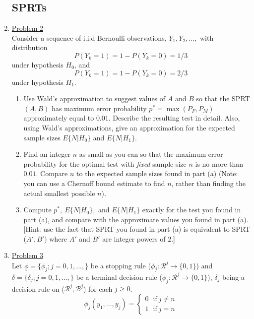\documentclass[a4paper,english,12pt]{article}
\begin{document}
\begin{enumerate}
\subsection*{SPRTs}
\item \hyperlink{solution2}{Problem 2}\\
Consider a sequence of i.i.d Bernoulli observations, $Y_1,Y_2,\dots,$ with distribution
\begin{equation*}
P(Y_k=1)=1-P(Y_k=0)=1/3
\end{equation*}
under hypothesis $H_0$, and 
\begin{equation*}
P(Y_k=1)=1-P(Y_k=0)=2/3
\end{equation*}
under hypothesis $H_1$.
\begin{enumerate}
\item Use Wald's approximation to suggest values of $A$ and $B$ so that the SPRT $(A,B)$ has maximum error probability $p^*=\max(P_F,P_M)$ approximately equal to $0.01$. Describe the resulting test in detail. Also, using Wald's approximations, give an approximation for the expected sample sizes $E\{N|H_0\}$ and $E\{N|H_1\}$.
\item Find an integer $n$ as small as you can so that the maximum error probability for the optimal test with {\em fixed} sample size $n$ is no more than $0.01$. Compare $n$ to the expected sample sizes found in part (a) (Note: you can use a Chernoff bound estimate to find $n$, rather than finding the actual smallest possible $n$).
\item Compute $p^*,~E\{N|H_0\},$ and $E\{N|H_1\}$ exactly for the test you found in part (a), and compare with the approximate values you found in part (a). [Hint: use the fact that SPRT you found in part (a) is equivalent to SPRT ($A',B'$) where $A'$ and $B'$ are integer powers of $2$.]
\end{enumerate}
\item \hyperlink{solution3}{Problem 3}\\
Let $\underline{\phi}=\{\phi_j;j=0,1,\dots,\}$ be a stopping rule ($\phi_j:\mathcal{R}^j\rightarrow \{0,1\}$) and $\underline{\delta}=\{\delta_j;j=0,1,\dots,\}$ be a terminal decision rule ($\phi_j:\mathcal{R}^j\rightarrow \{0,1\}$), $\delta_j$ being a decision rule on ($\mathcal{R}^j,\mathcal{B}^j$) for each $j \geq 0$.
\begin{equation*}
\phi_j(y_1,\dots,y_j)=\begin{cases}
0~\hspace{5pt}\mbox{if}~j\neq n\\
1~\hspace{5pt}\mbox{if}~j= n

\end{cases}
\end{equation*}
\end{enumerate}
\end{document}
